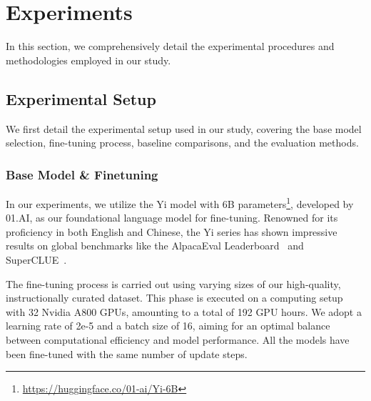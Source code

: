 \section{Experiments}

In this section, we comprehensively detail the experimental procedures and methodologies employed in our study.

\subsection{Experimental Setup}

We first detail the experimental setup used in our study, covering the base model selection, fine-tuning process, baseline comparisons, and the evaluation methods.

\subsubsection{Base Model \& Finetuning}

In our experiments, we utilize the Yi model with 6B parameters\footnote{\url{https://huggingface.co/01-ai/Yi-6B}}, developed by 01.AI, as our foundational language model for fine-tuning. Renowned for its proficiency in both English and Chinese, the Yi series has shown impressive results on global benchmarks like the AlpacaEval Leaderboard~\citep{dubois2023alpacafarm,alpaca_eval} and SuperCLUE~\citep{xu2023superclue}.

The fine-tuning process is carried out using varying sizes of our high-quality, instructionally curated dataset. This phase is executed on a computing setup with 32 Nvidia A800 GPUs, amounting to a total of 192 GPU hours. We adopt a learning rate of 2e-5 and a batch size of 16, aiming for an optimal balance between computational efficiency and model performance. All the models have been fine-tuned with the same number of update steps.

    

